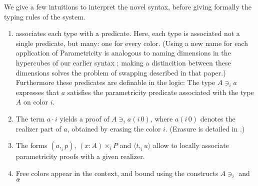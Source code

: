 \documentclass[english]{PaperTools/latex/lipics}
\newcommand\CP[3]{(#2,_{#1} #3)}
\newcommand\CTimes[2]{(#2) ×_{#1}}
\newcommand\param[1]{\!\cdot\!#1}
\newcommand\op[1]{∋_{#1}}
\newcommand\fp[3]{⟨#2 ,_{#1} #3⟩}
\newcommand\mor[2]{({#1}\,{#2})}
\newcommand\proj[2]{{#2}\mor{#1}0}
\begin{document}
We give a few intuitions to interpret the novel syntax, before giving formally the typing rules of the system. 
\begin{enumerate}
\item \citet{reynolds_types_1983} associates each type with a
  predicate. Here, each type is associated not a single predicate, but
  many: one for every color. (Using a new name for each application of
  Parametricity is analogous to naming dimensions in the hypercubes of
  our earlier syntax \citep{bernardy_computational_2012}; making a
  distincition between these dimensions solves the problem of
  swapping described in that paper.)
  Furthermore these predicates are definable
  in the logic: The type $A \op i a$ expresses that $a$ satisfies
  the parametricity predicate associated with the type $A$ on color
  $i$.
\item The term $a \param i$ yields a proof of $A \op i \proj i a$, where
  $\proj i a$ denotes the realizer part of $a$,
  obtained by erasing the color $i$. (Erasure is detailed in
  .)
\item The forms $\CP i a p$, $\CTimes i {x:A} P$ and $\fp i t u$ allow to
  locally associate parametricity proofs with a given realizer.
\item Free colors appear in the context, and bound using the
  constructs $A \op i {}$ and $a \param$
\end{enumerate}
\end{document}
